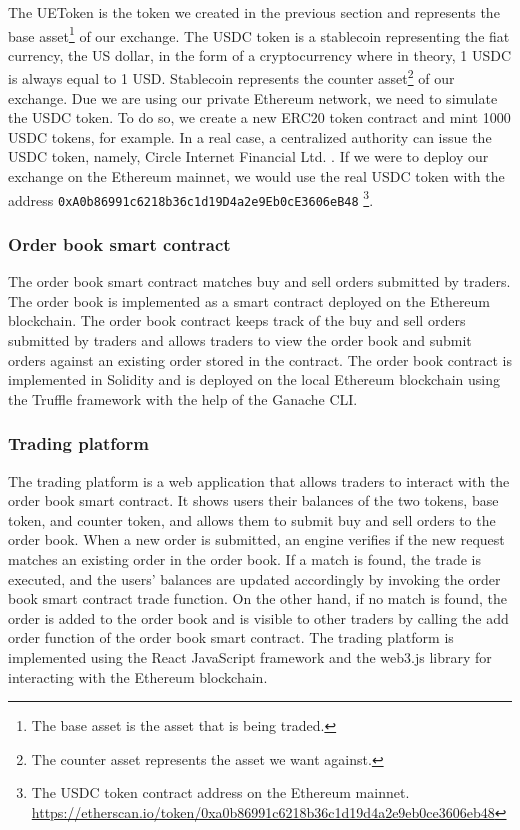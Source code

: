 The UEToken is the token we created in the previous section and represents
the base asset\footnote{The base asset is the asset that is being traded.} of our exchange.
The USDC token is a stablecoin representing the fiat currency, the US dollar, in the form of a cryptocurrency where in theory, 1 USDC is always
equal to 1 USD. Stablecoin represents the counter asset\footnote{The counter asset represents the asset we want against.} of our exchange. Due we
are using our private Ethereum network, we need to simulate the USDC token. To do so, we create a new ERC20 token contract and mint 1000 USDC
tokens, for example. In a real case, a centralized authority can issue the USDC token, namely, Circle Internet Financial Ltd. \cite{usdc}. If
we were to deploy our exchange on the Ethereum mainnet, we would use the real USDC token with the address \texttt{0xA0b86991c6218b36c1d19D4a2e9Eb0cE3606eB48}
\footnote{The USDC token contract address on the Ethereum mainnet. \url{https://etherscan.io/token/0xa0b86991c6218b36c1d19d4a2e9eb0ce3606eb48}}.

\subsubsection{Order book smart contract}


The order book smart contract matches buy and sell orders submitted by traders.
The order book is implemented as a smart contract deployed on the Ethereum blockchain. The order book contract keeps track
of the buy and sell orders submitted by traders and allows traders to view the order book and submit orders against an existing order stored
in the contract. The order book contract is implemented in Solidity and is deployed on the local Ethereum blockchain using the Truffle framework with
the help of the Ganache CLI.


\subsubsection{Trading platform}


The trading platform is a web application that allows traders to interact with the order book smart contract. It shows
users their balances of the two tokens, base token, and counter token, and allows them to submit buy and sell orders to the order book. When a new order
is submitted, an engine verifies if the new request matches an existing order in the order book. If a match is found, the trade is
executed, and the users' balances are updated accordingly by invoking the order book smart contract trade function. On the other hand, if no match is found, the order
is added to the order book and is visible to other traders by calling the add order function of the order book smart contract. The trading platform is
implemented using the React JavaScript framework and the web3.js library for interacting with the Ethereum blockchain.



